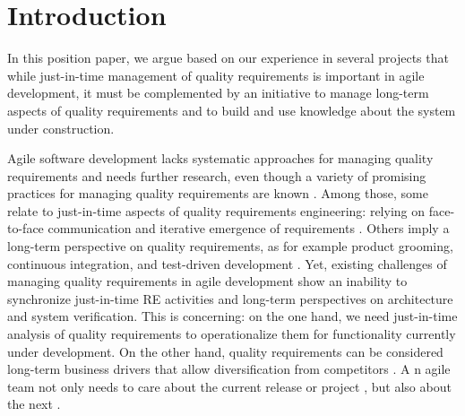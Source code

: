 \section{Introduction}




In this position paper, we argue based on our experience in several projects that while just-in-time management of quality requirements is important in agile development, it must be complemented by an initiative to manage long-term aspects of quality requirements and to build and use knowledge about the system under construction.




Agile software development lacks systematic approaches for managing quality requirements \cite{inayat2015systematic} and needs further research, even though a variety of promising practices for managing quality requirements are known \cite{Alsaqaf2017}. 
Among those, some relate to just-in-time aspects of quality requirements engineering: relying on face-to-face communication and iterative emergence of requirements \cite{Alsaqaf2017}. 
Others imply a long-term perspective on quality requirements, as for example product grooming, continuous integration, and test-driven development \cite{Alsaqaf2017}.
Yet, existing challenges of managing quality requirements in agile development show an inability to synchronize just-in-time RE activities and long-term perspectives on architecture and system verification. 
This is concerning: on the one hand, we need just-in-time analysis of quality requirements to operationalize them for functionality currently under development.
On the other hand, quality requirements can be considered long-term business drivers that allow diversification from competitors \cite{BerntssonSvensson2015}.
A%
n agile team not only needs to care about the current %
release or project%
, but also about the next %
\cite{Cockburn2009}.

